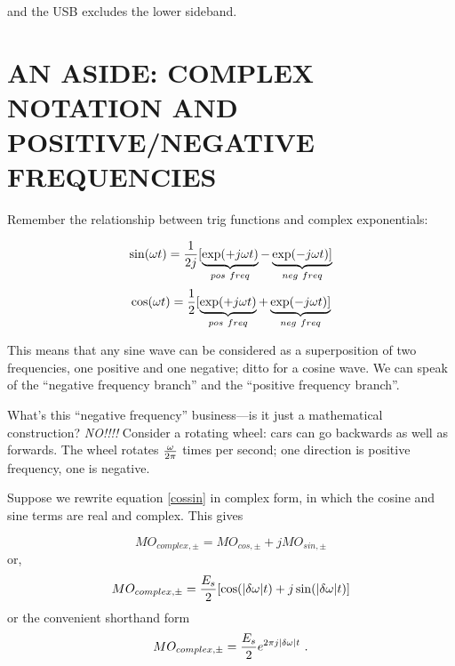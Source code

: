 \documentclass[11pt,preprint]{aastex}
\begin{document}
\noindent and the USB excludes the lower sideband.



\section{AN ASIDE: COMPLEX NOTATION AND POSITIVE/NEGATIVE FREQUENCIES}
\label{complex}

        Remember the relationship between trig functions and complex
exponentials:
                                                                        
       
\begin{mathletters} \label{cossin}
\begin{equation}
\sin(\omega t) = {1\over 2j} [\underbrace{\exp(+j\omega t)}_{pos\ freq}
        - \underbrace{\exp(-j\omega t)]}_{neg\ freq}
\end{equation}
\begin{equation}
\cos(\omega t) = {1\over 2} [\underbrace{\exp(+j\omega t)}_{pos\ freq}
        + \underbrace{\exp(-j\omega t)]}_{neg\ freq}
\end{equation}
\end{mathletters}
                                                                        
       
\noindent This means that any sine wave can be considered as a
superposition of two frequencies, one positive and one negative; ditto
for a cosine wave. We can speak of the ``negative frequency branch'' and
the
``positive frequency branch''.
                                                                        
       
        What's this ``negative frequency'' business---is it just a
mathematical construction? {\it NO!!!!} Consider a rotating wheel: cars
can go backwards as well as forwards. The wheel rotates $\omega \over
2\pi$ times per second; one direction is positive frequency, one is
negative.


        Suppose we rewrite equation \ref{cossin} in complex form, in
which the cosine and sine terms are real and complex. This gives

\begin{mathletters} 
\begin{equation}
	MO_{complex, \pm} = MO_{cos, \pm} + j MO_{sin, \pm} 
\end{equation}
\noindent or,  %
\begin{equation}
	MO_{complex, \pm} = {E_s \over 2} [ \cos ( |\delta \omega | t )
+ j \sin ( |\delta \omega | t )]
\end{equation}
\noindent or the convenient shorthand form
\begin{equation}
	MO_{complex, \pm} = {E_s \over 2} e^{2 \pi j |\delta \omega| t} \ .
\end{equation}
\end{mathletters}
\end{document}
